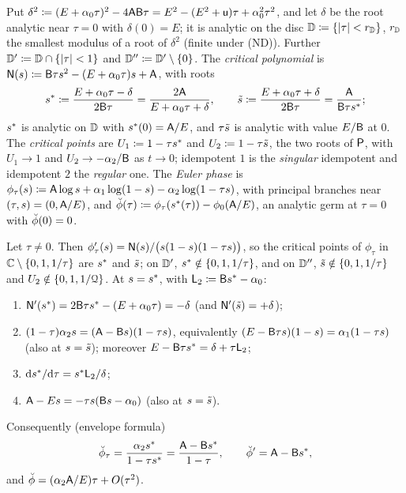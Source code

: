 \begin{defn}
\label{def:set-alg}
Put $\delta^2\coloneqq(E+\alpha_0\tau)^2-4\mathsf{A}\mathsf{B}\tau=E^2-(E^2+\mathsf{u})\tau+\alpha_0^2\tau^2$, and let $\delta$ be the root analytic near $\tau=0$ with $\delta(0)=E$; it is analytic on the disc $\mathbb{D}\coloneqq\{|\tau|<r_{\mathbb{D}}\}$, $r_{\mathbb{D}}$ the smallest modulus of a root of $\delta^2$ (finite under (ND)). Further $\mathbb{D}'\coloneqq\mathbb{D}\cap\{|\tau|<1\}$ and $\mathbb{D}''\coloneqq\mathbb{D}'\setminus\{0\}$. The \emph{critical polynomial} is $\mathsf{N}(s)\coloneqq\mathsf{B}\tau s^2-(E+\alpha_0\tau)s+\mathsf{A}$, with roots
\[
s^{\ast}\coloneqq\frac{E+\alpha_0\tau-\delta}{2\mathsf{B}\tau}=\frac{2\mathsf{A}}{E+\alpha_0\tau+\delta},\qquad
\tilde{s}\coloneqq\frac{E+\alpha_0\tau+\delta}{2\mathsf{B}\tau}=\frac{\mathsf{A}}{\mathsf{B}\tau s^{\ast}};
\]
$s^{\ast}$ is analytic on $\mathbb{D}$ with $s^{\ast}(0)=\mathsf{A}/E$, and $\tau\tilde{s}$ is analytic with value $E/\mathsf{B}$ at $0$. The \emph{critical points} are $U_1\coloneqq1-\tau s^{\ast}$ and $U_2\coloneqq1-\tau\tilde{s}$, the two roots of $\mathsf{P}$, with $U_1\to1$ and $U_2\to-\alpha_2/\mathsf{B}$ as $t\to0$; idempotent $1$ is the \emph{singular} idempotent and idempotent $2$ the \emph{regular} one. The \emph{Euler phase} is $\phi_\tau(s)\coloneqq\mathsf{A}\log s+\alpha_1\log(1-s)-\alpha_2\log(1-\tau s)$, with principal branches near $(\tau,s)=(0,\mathsf{A}/E)$, and $\breve{\phi}(\tau)\coloneqq\phi_\tau(s^{\ast}(\tau))-\phi_0(\mathsf{A}/E)$, an analytic germ at $\tau=0$ with $\breve{\phi}(0)=0$.
\end{defn}

\begin{lem}
\label{lem:set-N}
Let $\tau\neq0$. Then $\phi_\tau'(s)=\mathsf{N}(s)/\big(s(1-s)(1-\tau s)\big)$, so the critical points of $\phi_\tau$ in $\mathbb{C}\setminus\{0,1,1/\tau\}$ are $s^{\ast}$ and $\tilde{s}$; on $\mathbb{D}'$, $s^{\ast}\notin\{0,1,1/\tau\}$, and on $\mathbb{D}''$, $\tilde{s}\notin\{0,1,1/\tau\}$ and $U_2\notin\{0,1,1/\mathcal{Q}\}$. At $s=s^{\ast}$, with $\mathsf{L}_2\coloneqq\mathsf{B}s^{\ast}-\alpha_0$:
\begin{enumerate}
\item $\mathsf{N}'(s^{\ast})=2\mathsf{B}\tau s^{\ast}-(E+\alpha_0\tau)=-\delta$ (and $\mathsf{N}'(\tilde{s})=+\delta$);
\item $(1-\tau)\alpha_2s=(\mathsf{A}-\mathsf{B} s)(1-\tau s)$, equivalently $(E-\mathsf{B}\tau s)(1-s)=\alpha_1(1-\tau s)$ (also at $s=\tilde{s}$); moreover $E-\mathsf{B}\tau s^{\ast}=\delta+\tau\mathsf{L}_2$;
\item $\mathrm{d}s^{\ast}/\mathrm{d}\tau=s^{\ast}\mathsf{L}_2/\delta$;
\item $\mathsf{A}-Es=-\tau s(\mathsf{B} s-\alpha_0)$ (also at $s=\tilde{s}$).
\end{enumerate}
Consequently (envelope formula)
\begin{equation}
\label{eq:set-envelope}
\breve{\phi}_\tau=\frac{\alpha_2s^{\ast}}{1-\tau s^{\ast}}=\frac{\mathsf{A}-\mathsf{B}s^{\ast}}{1-\tau},\qquad \breve{\phi}'=\mathsf{A}-\mathsf{B}s^{\ast} ,
\end{equation}
and $\breve{\phi}=(\alpha_2\mathsf{A}/E)\tau+O(\tau^2)$.
\end{lem}

